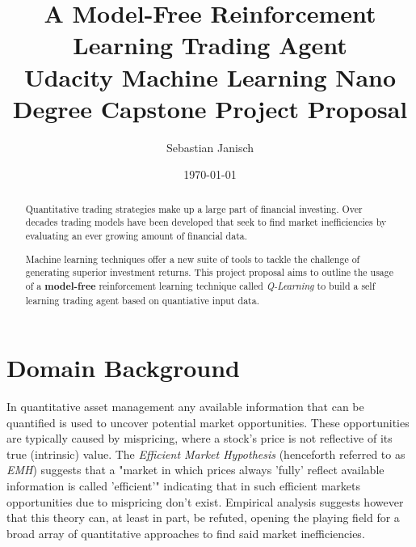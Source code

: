 \documentclass[dvips,12pt]{article}
\begin{document}

\title{A Model-Free Reinforcement Learning Trading Agent \\ \large Udacity Machine Learning Nano Degree Capstone Project Proposal}

\author{Sebastian Janisch}
\date{\today}



\maketitle


\begin{abstract}
Quantitative trading strategies make up a large part of financial investing. Over decades trading models have been developed that seek to find market inefficiencies by evaluating an ever growing amount of financial data. 

Machine learning techniques offer a new suite of tools to tackle the challenge of generating superior investment returns. This project proposal aims to outline the usage of a \textbf{model-free} reinforcement learning technique called \emph{Q-Learning} to build a self learning trading agent based on quantiative input data.
\end{abstract}

\section{Domain Background}
In quantitative asset management any available information that can be quantified is used to uncover potential market opportunities. 
These opportunities are typically caused by mispricing, where a stock's price is not reflective of its true (intrinsic) value. 
The \emph{Efficient Market Hypothesis} (henceforth referred to as \emph{EMH}) suggests that a "market in which prices always 'fully' reflect available information is called 'efficient'"\cite{fama1970} indicating that in such efficient markets opportunities due to mispricing don't exist. 
Empirical analysis suggests however that this theory can, at least in part, be refuted\cite{sewell2012}, opening the playing field for a broad array of quantitative approaches to find said market inefficiencies.
\end{document}
